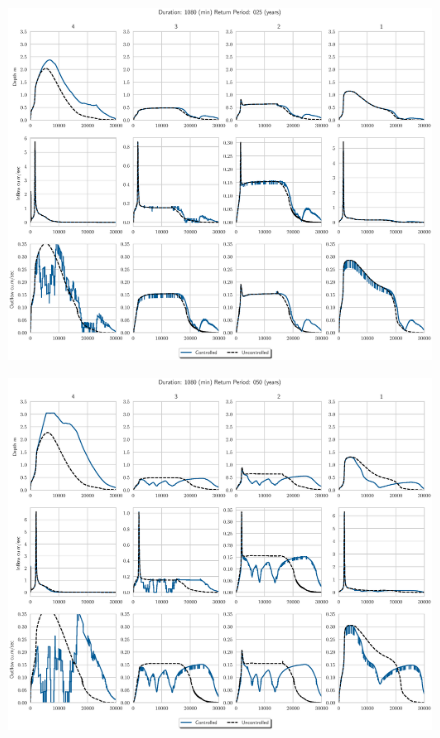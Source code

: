 \begin{figure}
    \centering
    \includegraphics[width=\linewidth]{./RL-SI-figures/77storms/1080025.eps}
\end{figure}
\begin{figure}
    \centering
    \includegraphics[width=\linewidth]{./RL-SI-figures/77storms/1080050.eps}
\end{figure}
